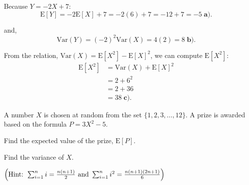 \documentclass[a4paper, 10pt]{article}
\begin{document}
\begin{solution}
	Because \( Y = -2X + 7 \):
	\[
		\text{E}[Y] = -2\text{E}[X] + 7 = -2(6) + 7 = -12 + 7 = \boxed{-5} \; \textbf{a).}
	\]

	and,
	\[
		\text{Var}(Y) = (-2)^2 \text{Var}(X) = 4(2) = \boxed{8} \; \textbf{b).}
	\]

	\myspace

	From the relation, \( \text{Var}(X) = \text{E}[X^2] - \text{E}[X]^2 \), we can compute \( \text{E}[X^2] \):
	\begin{align*}
		\text{E}[X^2] & = \text{Var}(X) + \text{E}[X]^2 \\
		              & = 2 + 6^2                       \\
		              & = 2 + 36                        \\
		              & = \boxed{38} \; \textbf{c).}
	\end{align*}
\end{solution}

\newpage

\begin{problem}
A number \( X \) is chosen at random from the set \( \{1, 2, 3, \dots , 12\} \).
A prize is awarded based on the formula \( P = 3X^2 - 5 \).
\begin{subproblems_alpha}
	\item Find the expected value of the prize, \( \text{E}[P] \).
	\item Find the variance of \( X \).
\end{subproblems_alpha}
\( \left(\text{Hint: } \sum_{i=1}^n i = \frac{n(n+1)}{2} \text{ and } \sum_{i=1}^n i^2 = \frac{n(n+1)(2n+1)}{6}\right) \)
\end{problem}
\end{document}
